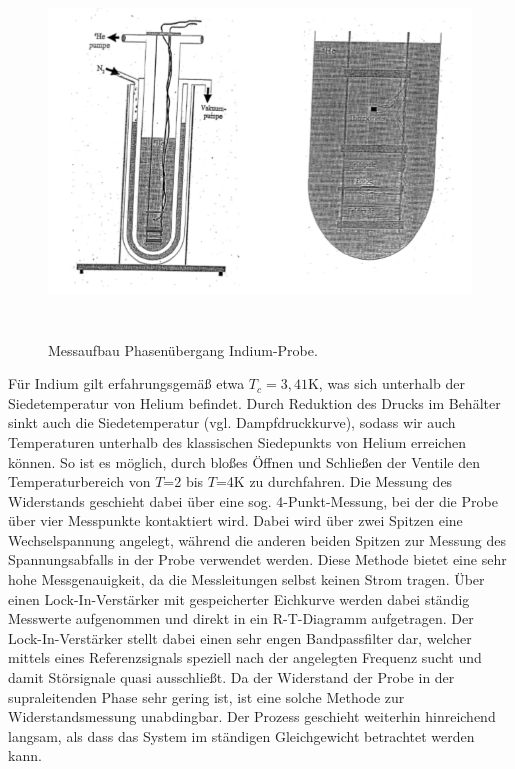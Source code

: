 \begin{figure}[h!]
	\centering
	\includegraphics[height=8cm]{Aufbau.png}	
	~ %
	\caption{Messaufbau Phasenübergang Indium-Probe. \cite{Anleitung}}
	\label{aufbau}
\end{figure}

Für Indium gilt erfahrungsgemäß etwa $T_c=3,41$K, was sich unterhalb der Siedetemperatur von Helium befindet. Durch Reduktion des Drucks im Behälter sinkt auch die Siedetemperatur (vgl. Dampfdruckkurve), sodass wir auch Temperaturen unterhalb des klassischen Siedepunkts von Helium erreichen können. So ist es möglich, durch bloßes Öffnen und Schließen der Ventile den Temperaturbereich von $T$=2 bis $T$=4K zu durchfahren. Die Messung des Widerstands geschieht dabei über eine sog. 4-Punkt-Messung, bei der die Probe über vier Messpunkte kontaktiert wird. Dabei wird über zwei Spitzen eine Wechselspannung angelegt, während die anderen beiden Spitzen zur Messung des Spannungsabfalls in der Probe verwendet werden. Diese Methode bietet eine sehr hohe Messgenauigkeit, da die Messleitungen selbst keinen Strom tragen. Über einen Lock-In-Verstärker mit gespeicherter Eichkurve werden dabei ständig Messwerte aufgenommen und direkt in ein R-T-Diagramm aufgetragen. Der Lock-In-Verstärker stellt dabei einen sehr engen Bandpassfilter dar, welcher mittels eines Referenzsignals speziell nach der angelegten Frequenz sucht und damit Störsignale quasi ausschließt. Da der Widerstand der Probe in der supraleitenden Phase sehr gering ist, ist eine solche Methode zur Widerstandsmessung unabdingbar. Der Prozess geschieht weiterhin hinreichend langsam, als dass das System im ständigen Gleichgewicht betrachtet werden kann.
